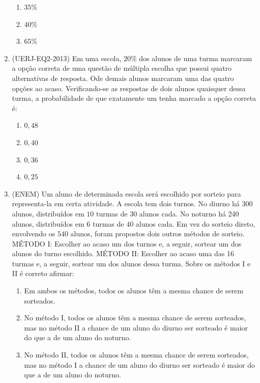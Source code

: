 \begin{enumerate}
\begin{enumerate}
\item {} 
$35\%$

\item {} 
$40\%$

\item {} 
$65\%$

\end{enumerate}

\item (UERJ-EQ2-2013) Em uma escola, $20\%$ dos alunos de uma turma marcaram a opção correta de uma questão de múltipla escolha que possui quatro alternativas de resposta. Ode demais alunos marcaram uma das quatro opções ao acaso. Verificando-se as respostas de dois alunos quaisquer dessa turma, a probabilidade de que exatamente um tenha marcado a opção correta é:
\begin{enumerate}
\item {} 
$0{,}48$

\item {} 
$0{,}40$

\item {} 
$0{,}36$

\item {} 
$0{,}25$

\end{enumerate}

\item (ENEM) Um aluno de determinada escola será escolhido por sorteio para representa-la em certa atividade. A escola tem dois turnos. No diurno há 300 alunos, distribuídos em $10$ turmas de $30$ alunos cada. No noturno há 240 alunos, distribuídos em $6$ turmas de $40$ alunos cada. Em vez do sorteio direto, envolvendo os $540$ alunos, foram propostos dois outros métodos de sorteio.
MÉTODO I: Escolher ao acaso um dos turnos e, a seguir, sortear um dos alunos do turno escolhido.
MÉTODO II: Escolher ao acaso uma das 16 turmas e, a seguir, sortear um dos alunos dessa turma.
Sobre os métodos I e II é correto afirmar:
\begin{enumerate}
\item {} 
Em ambos os métodos, todos os alunos têm a mesma chance de serem sorteados.

\item {} 
No método I, todos os alunos têm a mesma chance de serem sorteados, mas no método II a chance de um aluno do diurno ser sorteado é maior do que a de um aluno do noturno.

\item {} 
No método II, todos os alunos têm a mesma chance de serem sorteados, mas no método I a chance de um aluno do diurno ser sorteado é maior do que a de um aluno do noturno.


\end{enumerate}
\end{enumerate}

